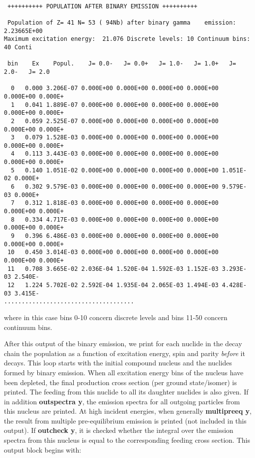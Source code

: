 \begin{samplecase}
{\small \begin{verbatim}

 ++++++++++ POPULATION AFTER BINARY EMISSION ++++++++++

 Population of Z= 41 N= 53 ( 94Nb) after binary gamma    emission: 2.23665E+00
Maximum excitation energy:  21.076 Discrete levels: 10 Continuum bins: 40 Conti
 
 bin    Ex    Popul.    J= 0.0-   J= 0.0+   J= 1.0-   J= 1.0+   J= 2.0-   J= 2.0

  0   0.000 3.206E-07 0.000E+00 0.000E+00 0.000E+00 0.000E+00 0.000E+00 0.000E+
  1   0.041 1.889E-07 0.000E+00 0.000E+00 0.000E+00 0.000E+00 0.000E+00 0.000E+
  2   0.059 2.525E-07 0.000E+00 0.000E+00 0.000E+00 0.000E+00 0.000E+00 0.000E+
  3   0.079 1.528E-03 0.000E+00 0.000E+00 0.000E+00 0.000E+00 0.000E+00 0.000E+
  4   0.113 3.443E-03 0.000E+00 0.000E+00 0.000E+00 0.000E+00 0.000E+00 0.000E+
  5   0.140 1.051E-02 0.000E+00 0.000E+00 0.000E+00 0.000E+00 1.051E-02 0.000E+
  6   0.302 9.579E-03 0.000E+00 0.000E+00 0.000E+00 0.000E+00 9.579E-03 0.000E+
  7   0.312 1.818E-03 0.000E+00 0.000E+00 0.000E+00 0.000E+00 0.000E+00 0.000E+
  8   0.334 4.717E-03 0.000E+00 0.000E+00 0.000E+00 0.000E+00 0.000E+00 0.000E+
  9   0.396 6.486E-03 0.000E+00 0.000E+00 0.000E+00 0.000E+00 0.000E+00 0.000E+
 10   0.450 3.014E-03 0.000E+00 0.000E+00 0.000E+00 0.000E+00 0.000E+00 0.000E+
 11   0.708 3.665E-02 2.036E-04 1.520E-04 1.592E-03 1.152E-03 3.293E-03 2.540E-
 12   1.224 5.702E-02 2.592E-04 1.935E-04 2.065E-03 1.494E-03 4.428E-03 3.415E-
.....................................
\end{verbatim} } \renewcommand{\baselinestretch}{1.07}\small\normalsize
\noindent
where in this case bins 0-10 concern discrete levels and bins 11-50 concern 
continuum bins.

After this output of the binary emission, we print
for each nuclide in the decay chain the population as a function of 
excitation energy, spin and parity {\em before} it decays. This loop starts 
with the initial compound nucleus and the nuclides formed by binary emission. 
When all excitation energy bins of the nucleus have been depleted, the final
production cross section (per ground state/isomer) is printed. The feeding from 
this nuclide to all its daughter nuclides is also given. If in addition 
{\bf outspectra y}, the emission spectra for all outgoing particles from this 
nucleus are printed. At high incident energies, when generally 
{\bf multipreeq y}, the result from multiple pre-equilibrium emission is 
printed (not included in this output). If {\bf outcheck y}, it is checked 
whether the integral over the 
emission spectra from this nucleus is equal to the corresponding feeding cross 
section. This output block begins with:


\end{samplecase}
